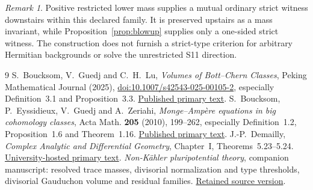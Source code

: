 \documentclass[11pt]{article}
\theoremstyle{remark}
\newtheorem{remark}[theorem]{Remark}
\begin{document}
\begin{remark}
Positive restricted lower mass supplies a mutual ordinary strict witness
downstairs within this declared family. It is preserved upstairs as a mass
invariant, while Proposition~\ref{prop:blowup} supplies only a one-sided
strict witness. The construction does not furnish a strict-type criterion
for arbitrary Hermitian backgrounds or solve the unrestricted S11 direction.
\end{remark}

\begin{thebibliography}{9}
 S.~Boucksom, V.~Guedj and C.~H.~Lu,
\emph{Volumes of Bott--Chern Classes}, Peking Mathematical Journal (2025),
\href{https://doi.org/10.1007/s42543-025-00105-2}{doi:10.1007/s42543-025-00105-2},
especially Definition~3.1 and Proposition~3.3.
\href{https://d-nb.info/1374372846/34}{Published primary text}.
 S.~Boucksom, P.~Eyssidieux, V.~Guedj and A.~Zeriahi,
\emph{Monge--Amp\`ere equations in big cohomology classes},
Acta Math. \textbf{205} (2010), 199--262, especially Definition~1.2,
Proposition~1.6 and Theorem~1.16.
\href{https://www.math.univ-toulouse.fr/~guedj/fichierspdf/BEGZ10.pdf}{Published primary text}.
 J.-P.~Demailly, \emph{Complex Analytic and Differential
Geometry}, Chapter~I, Theorems~5.23--5.24.
\href{https://people.math.harvard.edu/~siu/2dmml.pdf}{University-hosted primary text}.
 \emph{Non-K\"ahler pluripotential theory}, companion
manuscript: resolved trace masses, divisorial normalization and type
thresholds, divisorial Gauduchon volume and residual families.
\href{https://github.com/MingchenXia/non-kahler-pluripotential-theory/tree/1ff73204b833e197437c62dbe172815cb417bf7b/book/author}{Retained source version}.
\end{thebibliography}
\end{document}
